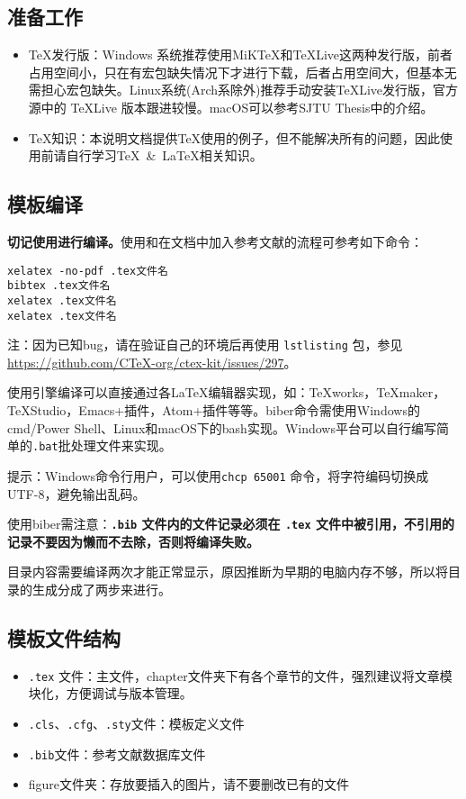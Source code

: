 \subsection{准备工作}
\begin{itemize}
  \item \TeX 发行版：Windows 系统推荐使用MiK\TeX 和\TeX Live这两种发行版，前者占用空间小，只在有宏包缺失情况下才进行下载，后者占用空间大，但基本无需担心宏包缺失。Linux系统(Arch系除外)推荐手动安装\TeX Live发行版，官方源中的 \TeX Live 版本跟进较慢。macOS可以参考SJTU Thesis中的介绍。
  \item \TeX 知识：本说明文档提供\TeX 使用的例子，但不能解决所有的问题，因此使用前请自行学习\TeX~\&~\LaTeX 相关知识。
\end{itemize}

\subsection{模板编译}

\textbf{切记使用\XeLaTeX 进行编译。}使用\XeLaTeX 和在文档中加入参考文献的流程可参考如下命令：

\iffalse
\begin{lstlisting}[basicstyle=\small\ttfamily, caption=手动逐次编译, numbers=none]
xelatex -no-pdf .tex文件名
bibtex .tex文件名
xelatex .tex文件名
xelatex .tex文件名
\end{lstlisting}
\else
\begin{verbatim}
xelatex -no-pdf .tex文件名
bibtex .tex文件名
xelatex .tex文件名
xelatex .tex文件名
\end{verbatim}

注：因为已知bug，请在验证自己的环境后再使用 \texttt{lstlisting} 包，参见\url{https://github.com/CTeX-org/ctex-kit/issues/297}。

\fi

使用\XeLaTeX 引擎编译可以直接通过各\LaTeX 编辑器实现，如：TeXworks，TeXmaker，TeXStudio，Emacs+插件，Atom+插件等等。biber命令需使用Windows的cmd/Power Shell、Linux和macOS下的bash实现。Windows平台可以自行编写简单的\verb|.bat|批处理文件来实现。

提示：Windows命令行用户，可以使用\verb|chcp 65001| 命令，将字符编码切换成 UTF-8，避免输出乱码。

使用biber需注意：\textbf{\texttt{.bib} 文件内的文件记录必须在 \texttt{.tex} 文件中被引用，不引用的记录不要因为懒而不去除，否则将编译失败。}

目录内容需要编译两次才能正常显示，原因推断为早期的电脑内存不够，所以将目录的生成分成了两步来进行。

\subsection{模板文件结构}
\begin{itemize}[noitemsep,topsep=0pt,parsep=0pt,partopsep=0pt]
  \item \verb|.tex| 文件：主文件，chapter文件夹下有各个章节的文件，强烈建议将文章模块化，方便调试与版本管理。
  \item \verb|.cls|、\verb|.cfg|、\verb|.sty|文件：模板定义文件
  \item \verb|.bib|文件：参考文献数据库文件
  \item figure文件夹：存放要插入的图片，请不要删改已有的文件
\end{itemize}
